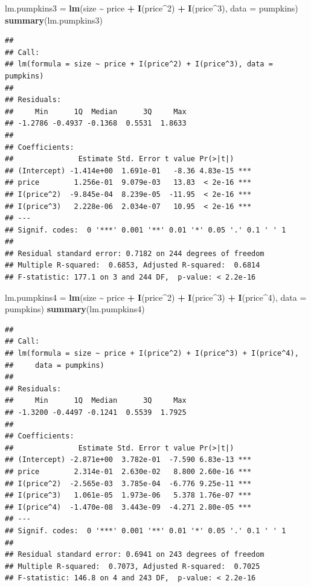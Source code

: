 \documentclass[
]{book}
\newenvironment{Shaded}{\begin{snugshade}}{\end{snugshade}}
\newcommand{\AttributeTok}[1]{\textcolor[rgb]{0.13,0.29,0.53}{#1}}
\newcommand{\DecValTok}[1]{\textcolor[rgb]{0.00,0.00,0.81}{#1}}
\newcommand{\FunctionTok}[1]{\textcolor[rgb]{0.13,0.29,0.53}{\textbf{#1}}}
\newcommand{\NormalTok}[1]{#1}
\newcommand{\OtherTok}[1]{\textcolor[rgb]{0.56,0.35,0.01}{#1}}
\newcommand{\SpecialCharTok}[1]{\textcolor[rgb]{0.81,0.36,0.00}{\textbf{#1}}}
\begin{document}
\begin{Shaded}
\begin{Highlighting}[]
\NormalTok{lm.pumpkins3 }\OtherTok{=} \FunctionTok{lm}\NormalTok{(size }\SpecialCharTok{\textasciitilde{}}\NormalTok{ price }\SpecialCharTok{+} \FunctionTok{I}\NormalTok{(price}\SpecialCharTok{\^{}}\DecValTok{2}\NormalTok{) }\SpecialCharTok{+} \FunctionTok{I}\NormalTok{(price}\SpecialCharTok{\^{}}\DecValTok{3}\NormalTok{), }\AttributeTok{data =}\NormalTok{ pumpkins)}
\FunctionTok{summary}\NormalTok{(lm.pumpkins3)}
\end{Highlighting}
\end{Shaded}

\begin{verbatim}
## 
## Call:
## lm(formula = size ~ price + I(price^2) + I(price^3), data = pumpkins)
## 
## Residuals:
##     Min      1Q  Median      3Q     Max 
## -1.2786 -0.4937 -0.1368  0.5531  1.8633 
## 
## Coefficients:
##               Estimate Std. Error t value Pr(>|t|)    
## (Intercept) -1.414e+00  1.691e-01   -8.36 4.83e-15 ***
## price        1.256e-01  9.079e-03   13.83  < 2e-16 ***
## I(price^2)  -9.845e-04  8.239e-05  -11.95  < 2e-16 ***
## I(price^3)   2.228e-06  2.034e-07   10.95  < 2e-16 ***
## ---
## Signif. codes:  0 '***' 0.001 '**' 0.01 '*' 0.05 '.' 0.1 ' ' 1
## 
## Residual standard error: 0.7182 on 244 degrees of freedom
## Multiple R-squared:  0.6853, Adjusted R-squared:  0.6814 
## F-statistic: 177.1 on 3 and 244 DF,  p-value: < 2.2e-16
\end{verbatim}

\begin{Shaded}
\begin{Highlighting}[]
\NormalTok{lm.pumpkins4 }\OtherTok{=} \FunctionTok{lm}\NormalTok{(size }\SpecialCharTok{\textasciitilde{}}\NormalTok{ price }\SpecialCharTok{+} \FunctionTok{I}\NormalTok{(price}\SpecialCharTok{\^{}}\DecValTok{2}\NormalTok{) }\SpecialCharTok{+} \FunctionTok{I}\NormalTok{(price}\SpecialCharTok{\^{}}\DecValTok{3}\NormalTok{) }\SpecialCharTok{+} \FunctionTok{I}\NormalTok{(price}\SpecialCharTok{\^{}}\DecValTok{4}\NormalTok{),}
    \AttributeTok{data =}\NormalTok{ pumpkins)}
\FunctionTok{summary}\NormalTok{(lm.pumpkins4)}
\end{Highlighting}
\end{Shaded}

\begin{verbatim}
## 
## Call:
## lm(formula = size ~ price + I(price^2) + I(price^3) + I(price^4), 
##     data = pumpkins)
## 
## Residuals:
##     Min      1Q  Median      3Q     Max 
## -1.3200 -0.4497 -0.1241  0.5539  1.7925 
## 
## Coefficients:
##               Estimate Std. Error t value Pr(>|t|)    
## (Intercept) -2.871e+00  3.782e-01  -7.590 6.83e-13 ***
## price        2.314e-01  2.630e-02   8.800 2.60e-16 ***
## I(price^2)  -2.565e-03  3.785e-04  -6.776 9.25e-11 ***
## I(price^3)   1.061e-05  1.973e-06   5.378 1.76e-07 ***
## I(price^4)  -1.470e-08  3.443e-09  -4.271 2.80e-05 ***
## ---
## Signif. codes:  0 '***' 0.001 '**' 0.01 '*' 0.05 '.' 0.1 ' ' 1
## 
## Residual standard error: 0.6941 on 243 degrees of freedom
## Multiple R-squared:  0.7073, Adjusted R-squared:  0.7025 
## F-statistic: 146.8 on 4 and 243 DF,  p-value: < 2.2e-16
\end{verbatim}
\end{document}
